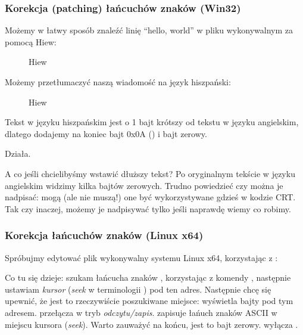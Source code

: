 \subsubsection{Korekcja (patching) łańcuchów znaków (Win32)}

Możemy w łatwy sposób znaleźć linię ``hello, world'' w pliku wykonywalnym za pomocą Hiew:

\begin{figure}[H]
\centering
{}
\caption{Hiew}
\label{}
\end{figure}

Możemy przetłumaczyć naszą wiadomość na język hiszpański:

\begin{figure}[H]
\centering
{}
\caption{Hiew}
\label{}
\end{figure}

Tekst w języku hiszpańskim jest o 1 bajt krótszy od tekstu w języku angielskim, dlatego dodajemy na koniec bajt 0x0A () i bajt zerowy.

Działa.

A co jeśli chcielibyśmy wstawić dłuższy tekst?
Po oryginalnym tekście w języku angielskim widzimy kilka bajtów zerowych.
Trudno powiedzieć czy można je nadpisać: mogą (ale nie muszą!) one być wykorzystywane gdzieś w kodzie \ac{CRT}.
Tak czy inaczej, możemy je nadpisywać tylko jeśli naprawdę wiemy co robimy.

\subsubsection{Korekcja łańcuchów znaków (Linux x64)}

\myindex{\radare}
Spróbujmy edytować plik wykonywalny systemu Linux x64, korzystając z \radare{}:



Co tu  się dzieje: szukam łańcucha znaków , korzystając z komendy \TT{/},
następnie ustawiam \emph{kursor} (\emph{seek} w terminologii \radare{}) pod ten adres.
Następnie chcę się upewnić, że jest to rzeczywiście poszukiwane miejsce:  wyświetla bajty pod tym adresem.
 przełącza \radare{} w tryb \emph{odczytu/zapis}.
 zapisuje łańuch znaków ASCII w miejscu kursora (\emph{seek}).
Warto zauważyć  na końcu, jest to bajt zerowy.
 wyłącza \radare.


